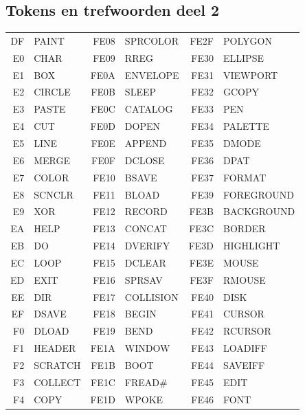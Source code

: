 \subsection{Tokens en trefwoorden deel 2}
{\ttfamily
\setlength{\tabcolsep}{1mm}
\begin{center}
\begin{tabular}{|rp{2.2cm}|rp{2.2cm}|rp{2.2cm}|}
\hline
  DF & PAINT      & FE08 & SPRCOLOR   & FE2F & POLYGON    \\
  E0 & CHAR       & FE09 & RREG       & FE30 & ELLIPSE    \\
  E1 & BOX        & FE0A & ENVELOPE   & FE31 & VIEWPORT   \\
  E2 & CIRCLE     & FE0B & SLEEP      & FE32 & GCOPY      \\
  E3 & PASTE      & FE0C & CATALOG    & FE33 & PEN        \\
  E4 & CUT        & FE0D & DOPEN      & FE34 & PALETTE    \\
  E5 & LINE       & FE0E & APPEND     & FE35 & DMODE      \\
  E6 & MERGE      & FE0F & DCLOSE     & FE36 & DPAT       \\
  E7 & COLOR      & FE10 & BSAVE      & FE37 & FORMAT     \\
  E8 & SCNCLR     & FE11 & BLOAD      & FE39 & FOREGROUND \\
  E9 & XOR        & FE12 & RECORD     & FE3B & BACKGROUND \\
  EA & HELP       & FE13 & CONCAT     & FE3C & BORDER     \\
  EB & DO         & FE14 & DVERIFY    & FE3D & HIGHLIGHT  \\
  EC & LOOP       & FE15 & DCLEAR     & FE3E & MOUSE      \\
  ED & EXIT       & FE16 & SPRSAV     & FE3F & RMOUSE     \\
  EE & DIR        & FE17 & COLLISION  & FE40 & DISK       \\
  EF & DSAVE      & FE18 & BEGIN      & FE41 & CURSOR     \\
  F0 & DLOAD      & FE19 & BEND       & FE42 & RCURSOR    \\
  F1 & HEADER     & FE1A & WINDOW     & FE43 & LOADIFF    \\
  F2 & SCRATCH    & FE1B & BOOT       & FE44 & SAVEIFF    \\
  F3 & COLLECT    & FE1C & FREAD\#    & FE45 & EDIT       \\
  F4 & COPY       & FE1D & WPOKE      & FE46 & FONT       \\

\end{tabular}
\end{center}}
